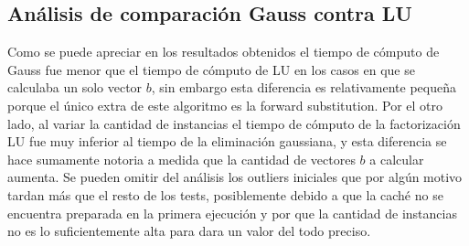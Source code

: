 \subsection{Análisis de comparación Gauss contra LU}
Como se puede apreciar en los resultados obtenidos el tiempo de cómputo de Gauss fue menor que el tiempo de cómputo de LU en los casos en que se calculaba un solo vector $b$, sin embargo esta diferencia es relativamente pequeña porque el único extra de este algoritmo es la forward substitution.
Por el otro lado, al variar la cantidad de instancias el tiempo de cómputo de la factorización LU fue muy inferior al tiempo de la eliminación gaussiana, y esta diferencia se hace sumamente notoria a medida que la cantidad de vectores $b$ a calcular aumenta. Se pueden omitir del análisis los outliers iniciales que por algún motivo tardan más que el resto de los tests, posiblemente debido a que la caché no se encuentra preparada en la primera ejecución y por que la cantidad de instancias no es lo suficientemente alta para dara un valor del todo preciso.
